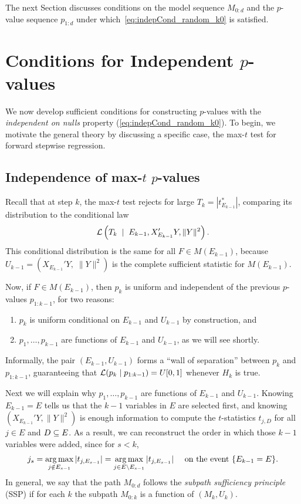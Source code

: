 \documentclass{article}
\begin{document}
The next Section discusses conditions on the model sequence $M_{0:d}$ and the $p$-value sequence $p_{1:d}$ under which~\eqref{eq:indepCond_random_k0} is satisfied.

\section{Conditions for Independent $p$-values}\label{sec:pValsIndep}

We now develop sufficient conditions for constructing $p$-values with the {\it independent on nulls} property (\ref{eq:indepCond_random_k0}). To begin, we motivate the general theory by discussing a specific case, the max-$t$ test for forward stepwise regression.

\subsection{Independence of max-$t$ $p$-values}

Recall that at step $k$, the max-$t$ test rejects for large $T_k=|t_{E_{k-1}}^*|$, comparing its distribution to the conditional law
\begin{equation}\label{eq:maxTnull}
\mathcal{L}\left(T_k \; \mid \; E_{k-1}, X_{E_{k-1}}'Y, \|Y\|^2 \right).
\end{equation}
This conditional distribution is the same for all $F\in M(E_{k-1})$, because $U_{k-1}=(X_{E_{k-1}}'Y,\; \|Y\|^2)$ is the complete sufficient statistic for $M(E_{k-1})$.

Now, if $F\in M(E_{k-1})$, then $p_k$ is uniform and independent of the previous $p$-values $p_{1:k-1}$, for two reasons:
\begin{enumerate}
\item $p_k$ is uniform conditional on $E_{k-1}$ and $U_{k-1}$ by construction, and
\item $p_1, \ldots, p_{k-1}$ are functions of $E_{k-1}$ and $U_{k-1}$, as we will see shortly.
\end{enumerate}

Informally, the pair $(E_{k-1}, U_{k-1})$ forms a ``wall of separation'' between $p_k$ and $p_{1:k-1}$, guaranteeing that $\mathcal{L}(p_k \mid p_{1:k-1}) = U[0,1]$ whenever $H_k$ is true. 

Next we will explain why $p_1,\ldots,p_{k-1}$ are functions of $E_{k-1}$ and $U_{k-1}$. Knowing $E_{k-1}=E$ tells us that the $k-1$ variables in $E$ are selected first, and knowing $(X_{E_{k-1}}'Y,\|Y\|^2)$ is enough information to compute the $t$-statistics $t_{j,D}$ for all $j\in E$ and $D\subseteq E$. As a result, we can reconstruct the order in which those $k-1$ variables were added, since for $s<k$, 
\[
j_s = \operatorname*{arg\,max}_{j \notin E_{s-1}} |t_{j,E_{s-1}}| 
= \operatorname*{arg\,max}_{j \in E\setminus E_{s-1}} |t_{j,E_{s-1}}| \quad \text{ on the event } \{E_{k-1}=E\}.
\]
In general, we say that the path $M_{0:d}$ follows the {\em subpath sufficiency principle} (SSP) if for each $k$ the subpath $M_{0:k}$ is a function of $(M_k,U_k)$.
\end{document}
